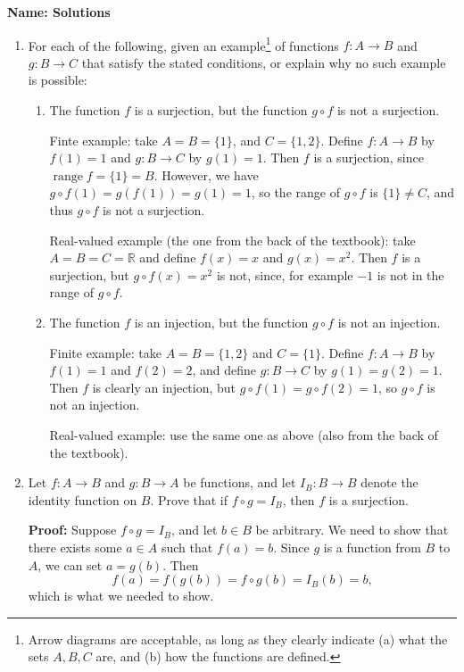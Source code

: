 \documentclass[12pt]{article}
\newcommand{\points}[1]{\marginpar{\hspace{24pt}[#1]}}
\newcommand{\R}{\mathbb{R}}
\begin{document}
{\bf Name: Solutions}
\thispagestyle{fancy}

\bigskip


\begin{enumerate}
 \item For each of the following, given an example\footnote{Arrow diagrams are acceptable, as long as they clearly indicate (a) what the sets $A,B,C$ are, and (b) how the functions are defined.} of functions $f:A\to B$ and $g:B\to C$ that satisfy the stated conditions, or explain why no such example is possible:
\begin{enumerate}
 \item The function $f$ is a surjection, but the function $g\circ f$ is not a surjection. \points{3}

\bigskip

Finte example: take $A=B=\{1\}$, and $C=\{1,2\}$. Define $f:A\to B$ by $f(1)=1$ and $g:B\to C$ by $g(1)=1$. Then $f$ is a surjection, since $\operatorname{range}f = \{1\}=B$. However, we have $g\circ f(1) = g(f(1))=g(1)=1$, so the range of $g\circ f$ is $\{1\}\neq C$, and thus $g\circ f$ is not a surjection.

\medskip

Real-valued example (the one from the back of the textbook): take $A=B=C=\R$ and define $f(x)=x$ and $g(x)=x^2$. Then $f$ is a surjection, but $g\circ f(x) = x^2$ is not, since, for example $-1$ is not in the range of $g\circ f$.

\bigskip

 \item The function $f$ is an injection, but the function $g\circ f$ is not an injection. \points{3}

 \bigskip

Finite example: take $A=B=\{1,2\}$ and $C=\{1\}$. Define $f:A\to B$ by $f(1)=1$ and $f(2)=2$, and define $g:B\to C$ by $g(1)=g(2)=1$. Then $f$ is clearly an injection, but $g\circ f(1) = g\circ f(2) = 1$, so $g\circ f$ is not an injection.

\medskip

Real-valued example: use the same one as above (also from the back of the textbook).

\bigskip

 \end{enumerate}
\item Let $f:A\to B$ and $g:B\to A$ be functions, and let $I_B:B\to B$ denote the identity function on $B$. Prove that if $f\circ g=I_B$, then $f$ is a surjection.\points{4}

\bigskip

{\bf Proof:} Suppose $f\circ g=I_B$, and let $b\in B$ be arbitrary. We need to show that there exists some $a\in A$ such that $f(a)=b$. Since $g$ is a function from $B$ to $A$, we can set $a=g(b)$. Then
\[
 f(a) = f(g(b)) = f\circ g(b) = I_B(b) = b,
\]
which is what we needed to show.

\end{enumerate}
\end{document}

